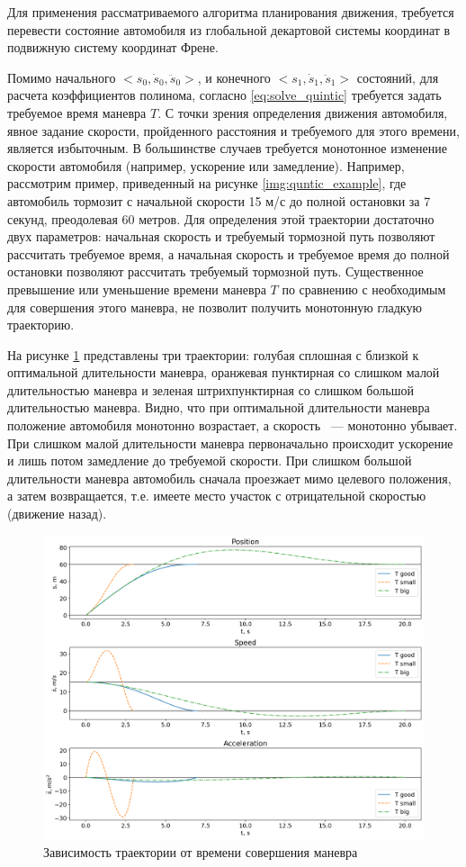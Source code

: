 Для применения рассматриваемого алгоритма планирования движения, требуется перевести состояние автомобиля из
глобальной декартовой системы координат в подвижную систему координат Френе.

Помимо начального $<s_0, \dot{s}_0, \ddot{s}_0>$, и конечного $<s_1, \dot{s}_1, \ddot{s}_1>$ состояний, для расчета
коэффициентов полинома, согласно \ref{eq:solve_quintic} требуется задать требуемое время маневра $T$. С точки зрения
определения движения автомобиля, явное задание скорости, пройденного расстояния и требуемого для этого времени, является
избыточным. В большинстве случаев требуется монотонное изменение скорости автомобиля (например, ускорение или
замедление). Например, рассмотрим пример, приведенный на рисунке \ref{img:quntic_example}, где автомобиль
тормозит с начальной скорости 15 м/с до полной остановки за 7 секунд, преодолевая 60 метров. Для определения этой траектории
достаточно двух параметров: начальная скорость и требуемый тормозной путь позволяют рассчитать требуемое время, а
начальная скорость и требуемое время до полной остановки позволяют рассчитать требуемый тормозной путь. Существенное
превышение или уменьшение времени маневра $T$ по сравнению с необходимым для совершения этого маневра, не позволит
получить монотонную гладкую траекторию.

На рисунке \ref{img:quintic_bad_t} представлены три траектории:
голубая сплошная с близкой к оптимальной длительности маневра, оранжевая пунктирная со слишком малой длительностью
маневра и зеленая штрихпунктирная со слишком большой длительностью маневра.
Видно, что при оптимальной длительности маневра положение автомобиля монотонно
возрастает, а скорость ~--- монотонно убывает. При слишком малой длительности маневра первоначально происходит
ускорение и лишь потом замедление до требуемой скорости. При слишком большой длительности маневра автомобиль сначала
проезжает мимо целевого положения, а затем возвращается, т.е. имеете место участок с отрицательной скоростью
(движение назад).

\begin{figure}[h]
      \centering
      \includegraphics[width=\linewidth]{images/quintic_bad_t}
      \caption{Зависимость траектории от времени совершения маневра}
      \label{img:quintic_bad_t}
\end{figure}


